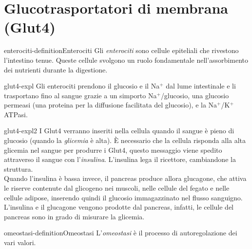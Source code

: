 \documentclass[preview]{standalone}
\begin{document}
\genpage

\section{Glucotrasportatori di membrana (Glut4)}

\begin{snippetdefinition}{enterociti-definition}{Enterociti}
    Gli \textit{enterociti} sono cellule epiteliali che rivestono l'intestino tenue.
    Queste cellule svolgono un ruolo fondamentale nell'assorbimento dei nutrienti durante la digestione.
\end{snippetdefinition}

\begin{snippet}{glut4-expl}
    Gli enterociti prendono il glucosio e il Na\({}^+\) dal lume intestinale
    e li trasportano fino al sangue grazie a un simporto Na\({}^+\)/glucosio, una glucosio permeasi
    (una proteina per la diffusione facilitata del glucosio), e la Na\({}^+\)/K\({}^+\)ATPasi. 
\end{snippet}



\begin{snippet}{glut4-expl2}
    I Glut4 verranno inseriti nella cellula quando il sangue è pieno di glucosio (quando la \textit{glicemia} è alta).
È necessario che la cellula risponda alla alta glicemia nel sangue per produrre i Glut4,
questo messaggio viene spedito attraverso il sangue con l'\textit{insulina}.
L'insulina lega il ricettore, cambiandone la struttura. \\
Quando l'insulina è bassa invece, il pancreas produce allora glucagone, che attiva le riserve contenute
dal glicogeno nei muscoli, nelle cellule del fegato e nelle cellule adipose, inserendo quindi il glucosio
immagazzinato nel flusso sanguigno.
L'insulina e il glucagone vengono prodotte dal pancreas, infatti, le cellule del pancreas sono in grado di misurare la glicemia.
\end{snippet}



\begin{snippetdefinition}{omeostasi-definition}{Omeostasi}
    L'\textit{omeostasi} è il processo di autoregolazione dei vari valori.
\end{snippetdefinition}


\end{document}
